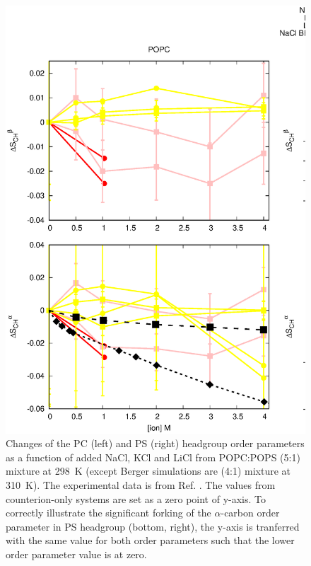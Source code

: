 \documentclass[aps,prl,superscriptaddress,twocolumn]{revtex4}
\begin{document}
\begin{figure}[]
  \centering
  \includegraphics[width=18.0cm]{../Figs/CHANGESwithMONVALENTwithPS.eps}
  \caption{\label{PSresponseTONaCl}
    Changes of the PC (left) and PS (right) headgroup order parameters as a function of
    added NaCl, KCl and LiCl from POPC:POPS (5:1) mixture at 298~K
    (except Berger simulations are (4:1) mixture at 310~K).
    The experimental data is from Ref. .
    The values from counterion-only systems are set as a zero point of y-axis.
    To correctly illustrate the significant forking of the $\alpha$-carbon order parameter
    in PS headgroup (bottom, right), the y-axis is tranferred with the same value for both order parameters such that the lower order
    parameter value is at zero.
  }
\end{figure}
\end{document}

